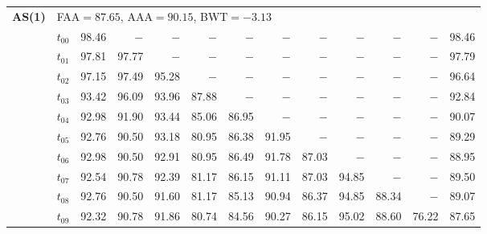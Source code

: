 \begin{table}[ht]
\begin{tabular}{@{}l l r r r r r r r r r r r@{}}
\midrule
\multirow{11}{*}{\textbf{AS(1)}} & \multicolumn{12}{l}{\quad\small FAA$=87.65$,\; AAA$=90.15$,\; BWT$=-3.13$} \\
 & $t_{00}$ & 98.46 & $-$ & $-$ & $-$ & $-$ & $-$ & $-$ & $-$ & $-$ & $-$ & 98.46 \\
 & $t_{01}$ & 97.81 & 97.77 & $-$ & $-$ & $-$ & $-$ & $-$ & $-$ & $-$ & $-$ & 97.79 \\
 & $t_{02}$ & 97.15 & 97.49 & 95.28 & $-$ & $-$ & $-$ & $-$ & $-$ & $-$ & $-$ & 96.64 \\
 & $t_{03}$ & 93.42 & 96.09 & 93.96 & 87.88 & $-$ & $-$ & $-$ & $-$ & $-$ & $-$ & 92.84 \\
 & $t_{04}$ & 92.98 & 91.90 & 93.44 & 85.06 & 86.95 & $-$ & $-$ & $-$ & $-$ & $-$ & 90.07 \\
 & $t_{05}$ & 92.76 & 90.50 & 93.18 & 80.95 & 86.38 & 91.95 & $-$ & $-$ & $-$ & $-$ & 89.29 \\
 & $t_{06}$ & 92.98 & 90.50 & 92.91 & 80.95 & 86.49 & 91.78 & 87.03 & $-$ & $-$ & $-$ & 88.95 \\
 & $t_{07}$ & 92.54 & 90.78 & 92.39 & 81.17 & 86.15 & 91.11 & 87.03 & 94.85 & $-$ & $-$ & 89.50 \\
 & $t_{08}$ & 92.76 & 90.50 & 91.60 & 81.17 & 85.13 & 90.94 & 86.37 & 94.85 & 88.34 & $-$ & 89.07 \\
 & $t_{09}$ & 92.32 & 90.78 & 91.86 & 80.74 & 84.56 & 90.27 & 86.15 & 95.02 & 88.60 & 76.22 & 87.65 \\
\bottomrule
\end{tabular}
\end{table}

